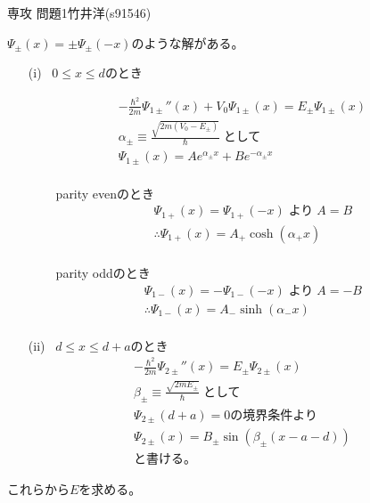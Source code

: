 \documentclass[fleqn]{jbook}
\begin{document}
\begin{answer}{専攻 問題1}{竹井洋(s91546)}
\begin{subanswers}

\SubAnswer
$\Psi_{\pm}(x)=\pm\Psi_{\pm}(-x)$のような解がある。
\begin{itemize}
\item[(i)]
~$0\le x \le d$のとき

\begin{gather*}
-\frac{\hbar^2}{2m}\Psi_{1\pm}''(x)+V_0\Psi_{1\pm}(x)=E_{\pm}\Psi_{1\pm}(x) \\
\alpha_{\pm}\equiv\frac{\sqrt{2m(V_0-E_{\pm})}}{\hbar}\;  \text{として} \\
\Psi_{1\pm}(x)=Ae^{\alpha_{\pm} x}+Be^{-\alpha_{\pm} x} \\
\end{gather*}

\begin{itemize}

\item[\textbullet] ~parity evenのとき
\begin{gather*}
\Psi_{1+}(x)=\Psi_{1+}(-x)\; \text{より} \; A=B \\
\therefore \Psi_{1+}(x)=A_+\cosh (\alpha_+ x) \\
\end{gather*}

\item[\textbullet] ~parity oddのとき
\begin{gather*}
\Psi_{1-}(x)=-\Psi_{1-}(-x)\; \text{より} \; A=-B \\
\therefore \Psi_{1-}(x)=A_-\sinh (\alpha_- x) \\
\end{gather*}

\end{itemize}

\item[(ii)]
~$d\le x \le d+a$のとき
\begin{gather*}
-\frac{\hbar^2}{2m}\Psi_{2\pm}''(x)=E_{\pm}\Psi_{2\pm}(x) \\
\beta_{\pm}\equiv \frac{\sqrt{2mE_\pm}}{\hbar}\; \text{として}\\
\Psi_{2\pm}(d+a)=0\text{の境界条件より}\\
\Psi_{2\pm}(x)=B_{\pm}\sin\left(\beta_\pm(x-a-d)\right) \\
\text{と書ける。}
\end{gather*}

\end{itemize}
これらから$E$を求める。


\end{subanswers}
\end{answer}
\end{document}
